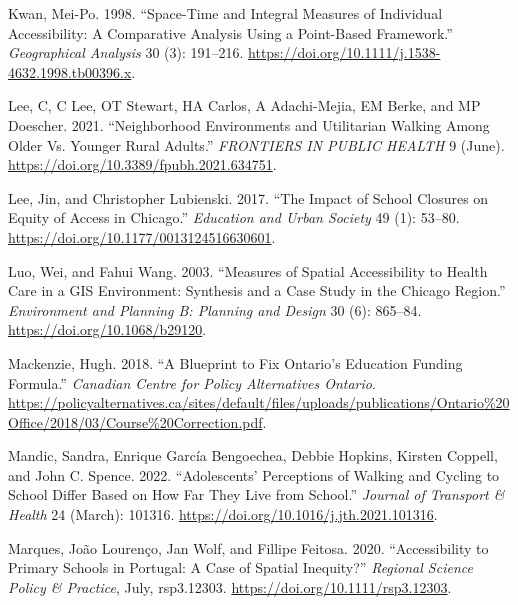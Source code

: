 \documentclass[
default
]{sn-jnl}
\newlength{\cslhangindent}
\newenvironment{CSLReferences}[2] %
 {\begin{list}{}{%
  \setlength{\itemindent}{0pt}
  \setlength{\leftmargin}{0pt}
  \setlength{\parsep}{0pt}
  \ifodd #1
   \setlength{\leftmargin}{\cslhangindent}
   \setlength{\itemindent}{-1\cslhangindent}
  \fi
  \setlength{\itemsep}{#2\baselineskip}}}
 {\end{list}}
\begin{document}
\begin{CSLReferences}{1}{0}
Kwan, Mei-Po. 1998. {``Space-Time and Integral Measures of Individual
Accessibility: A Comparative Analysis Using a Point-Based Framework.''}
\emph{Geographical Analysis} 30 (3): 191--216.
\url{https://doi.org/10.1111/j.1538-4632.1998.tb00396.x}.

Lee, C, C Lee, OT Stewart, HA Carlos, A Adachi-Mejia, EM Berke, and MP
Doescher. 2021. {``Neighborhood Environments and Utilitarian Walking
Among Older Vs. Younger Rural Adults.''} \emph{{FRONTIERS} {IN} {PUBLIC}
{HEALTH}} 9 (June). \url{https://doi.org/10.3389/fpubh.2021.634751}.

Lee, Jin, and Christopher Lubienski. 2017. {``The Impact of School
Closures on Equity of Access in Chicago.''} \emph{Education and Urban
Society} 49 (1): 53--80. \url{https://doi.org/10.1177/0013124516630601}.

Luo, Wei, and Fahui Wang. 2003. {``Measures of {Spatial Accessibility}
to {Health Care} in a {GIS Environment}: {Synthesis} and a {Case Study}
in the {Chicago Region}.''} \emph{Environment and Planning B: Planning
and Design} 30 (6): 865--84. \url{https://doi.org/10.1068/b29120}.

Mackenzie, Hugh. 2018. {``A Blueprint to Fix Ontario's Education Funding
Formula.''} \emph{Canadian Centre for Policy Alternatives {\textbar}
Ontario}.
\url{https://policyalternatives.ca/sites/default/files/uploads/publications/Ontario\%20Office/2018/03/Course\%20Correction.pdf}.

Mandic, Sandra, Enrique García Bengoechea, Debbie Hopkins, Kirsten
Coppell, and John C. Spence. 2022. {``Adolescents' Perceptions of
Walking and Cycling to School Differ Based on How Far They Live from
School.''} \emph{Journal of Transport \& Health} 24 (March): 101316.
\url{https://doi.org/10.1016/j.jth.2021.101316}.

Marques, João Lourenço, Jan Wolf, and Fillipe Feitosa. 2020.
{``Accessibility to Primary Schools in Portugal: A Case of Spatial
Inequity?''} \emph{Regional Science Policy \& Practice}, July,
rsp3.12303. \url{https://doi.org/10.1111/rsp3.12303}.


\end{CSLReferences}
\end{document}

